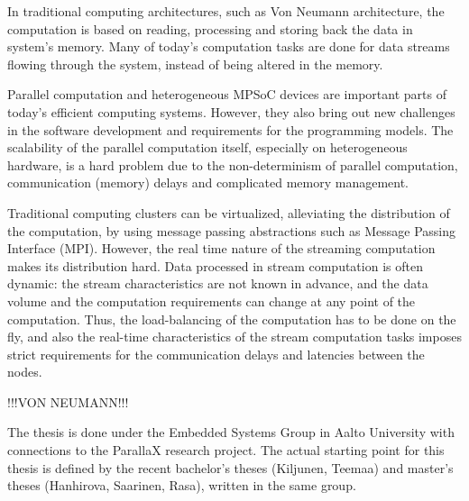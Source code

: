 In traditional computing architectures, such as Von Neumann architecture, the computation is based on reading, processing and storing back the data in system's memory. Many of today's computation tasks are
done for data streams flowing through the system, instead of being altered in the memory.

Parallel computation and heterogeneous MPSoC devices are important parts of today's efficient computing systems. However, they also bring out new challenges in the software development and requirements for the programming models. The scalability of the parallel computation itself, especially on heterogeneous hardware, is a hard problem due to the non-determinism of parallel computation, communication (memory) delays and complicated memory management.

Traditional computing clusters can be virtualized, alleviating the distribution of the computation, by using message passing abstractions such as Message Passing Interface (MPI). However, the real time nature of the streaming computation makes its distribution hard. Data processed in stream computation is often dynamic: the stream characteristics are not known in advance, and the data volume and the computation requirements can change at any point of the computation. Thus, the load-balancing of the computation has to be done on the fly, and also the real-time characteristics of the stream computation tasks imposes strict requirements for the communication delays and latencies between the nodes.

!!!VON NEUMANN!!!




The thesis is done under the Embedded Systems Group in Aalto University with connections to the ParallaX research project. The actual starting point for this thesis is defined by the recent bachelor's theses (Kiljunen, Teemaa) and master's theses (Hanhirova, Saarinen, Rasa), written in the same group.

